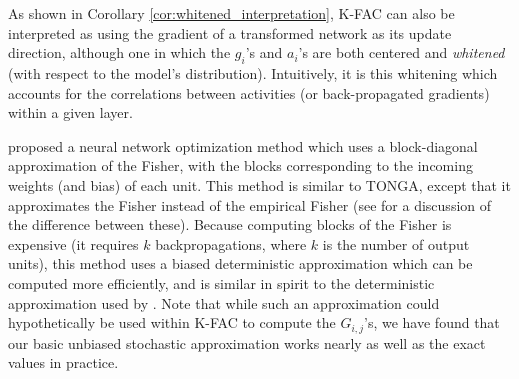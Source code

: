 \documentclass[12pt]{article}
\newcommand{\acronym}{K-FAC}
\begin{document}
%
%

As shown in Corollary \ref{cor:whitened_interpretation}, \acronym{} can also be interpreted as using the gradient of a transformed network as its update direction, although one in which the $g_i$'s and $a_i$'s are both centered and \emph{whitened} (with respect to the model's distribution). Intuitively, it is this whitening which accounts for the correlations between activities (or back-propagated gradients) within a given layer. %



\citet{Ollivier} proposed a neural network optimization method which uses a block-diagonal approximation of the Fisher, with the blocks corresponding to the incoming weights (and bias) of each unit.  This method is similar to TONGA, except that it approximates the Fisher instead of the empirical Fisher (see \citet{ng_martens} for a discussion of the difference between these).  Because computing blocks of the Fisher is expensive (it requires $k$ backpropagations, where $k$ is the number of output units), this method uses a biased deterministic approximation which can be computed more efficiently, and is similar in spirit to the deterministic approximation used by \citet{lecun_tricks}.  %
Note that while such an approximation could hypothetically be used within \acronym{} to compute the $G_{i,j}$'s, we have found that our basic unbiased stochastic approximation works nearly as well as the exact values in practice.
\end{document}
